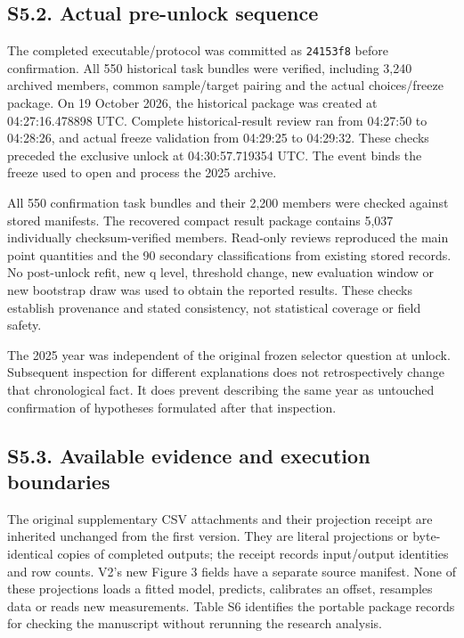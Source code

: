\documentclass[
  british,
  11pt,
]{article}
\begin{document}
\subsection{S5.2. Actual pre-unlock
sequence}\label{s5.2.-actual-pre-unlock-sequence}

The completed executable/protocol was committed as \texttt{24153f8}
before confirmation. All 550 historical task bundles were verified,
including 3,240 archived members, common sample/target pairing and the
actual choices/freeze package. On 19 October 2026, the historical
package was created at 04:27:16.478898 UTC. Complete historical-result
review ran from 04:27:50 to 04:28:26, and actual freeze validation from
04:29:25 to 04:29:32. These checks preceded the exclusive unlock at
04:30:57.719354 UTC. The event binds the freeze used to open and process
the 2025 archive.

All 550 confirmation task bundles and their 2,200 members were checked
against stored manifests. The recovered compact result package contains
5,037 individually checksum-verified members. Read-only reviews
reproduced the main point quantities and the 90 secondary
classifications from existing stored records. No post-unlock refit, new
q level, threshold change, new evaluation window or new bootstrap draw
was used to obtain the reported results. These checks establish
provenance and stated consistency, not statistical coverage or field
safety.

The 2025 year was independent of the original frozen selector question
at unlock. Subsequent inspection for different explanations does not
retrospectively change that chronological fact. It does prevent
describing the same year as untouched confirmation of hypotheses
formulated after that inspection.

\subsection{S5.3. Available evidence and execution
boundaries}\label{s5.3.-available-evidence-and-execution-boundaries}

The original supplementary CSV attachments and their projection receipt
are inherited unchanged from the first version. They are literal
projections or byte-identical copies of completed outputs; the receipt
records input/output identities and row counts. V2's new Figure 3 fields
have a separate source manifest. None of these projections loads a
fitted model, predicts, calibrates an offset, resamples data or reads
new measurements. Table S6 identifies the portable package records for
checking the manuscript without rerunning the research analysis.
\end{document}
